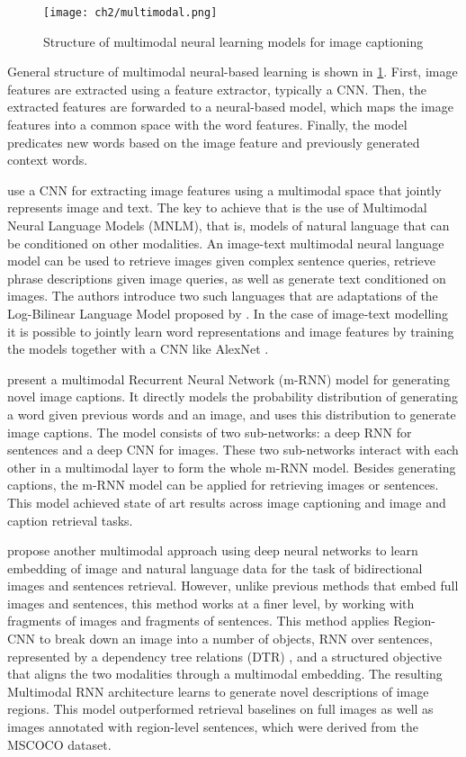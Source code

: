 \begin{figure}[hpt]
	\centering
	\texttt{[image: ch2/multimodal.png]}
	\caption{Structure of multimodal neural learning models for image captioning}
	\label{fig:multimodal}
\end{figure}

General structure of multimodal neural-based learning is shown in \cref{fig:multimodal}. First, image features are extracted using a feature extractor, typically a CNN. Then, the extracted features are forwarded to a neural-based model, which maps the image features into a common space with the word features. Finally, the model predicates new words based on the image feature and previously generated context words.

\citet{Kiros2014_VS} use a CNN for extracting image features using a multimodal space that jointly represents image and text. The key to achieve that is the use of Multimodal Neural Language Models (MNLM), that is, models of natural language that can be conditioned on other modalities. An image-text multimodal neural language model can be used to retrieve images given complex sentence queries, retrieve phrase descriptions given image queries, as well as generate text conditioned on images. The authors introduce two such languages that are adaptations of the Log-Bilinear Language Model proposed by \citet{Mnih2007}. In the case of image-text modelling it is possible to jointly learn word representations and image features by training the models together with a CNN like AlexNet \citep{Krizhevsky2012}.

\citet{Mao2014, Mao2015_mRNN} present a multimodal Recurrent Neural Network (m-RNN) model for generating novel image captions. It directly models the probability distribution of generating a word given previous words and an image, and uses this distribution to generate image captions. The model consists of two sub-networks: a deep RNN for sentences and a deep CNN for images. These two sub-networks interact with each other in a multimodal layer to form the whole m-RNN model. Besides generating captions, the m-RNN model can be applied for retrieving images or sentences. This model achieved state of art results across image captioning and image and caption retrieval tasks.

\citet{Karpathy2015} propose another multimodal approach using deep neural networks to learn embedding of image and natural language data for the task of bidirectional images and sentences retrieval. However, unlike previous methods that embed full images and sentences, this method works at a finer level, by working with fragments of images and fragments of sentences. This method applies Region-CNN to break down an image into a number of objects, RNN over sentences, represented by a dependency tree relations (DTR) \citep{DeMarneffe2006}, and a structured objective that aligns the two modalities through a multimodal embedding. The resulting Multimodal RNN architecture learns to generate novel descriptions of image regions. This model outperformed retrieval baselines on full images as well as images annotated with region-level sentences, which were derived from the MSCOCO dataset.
 
